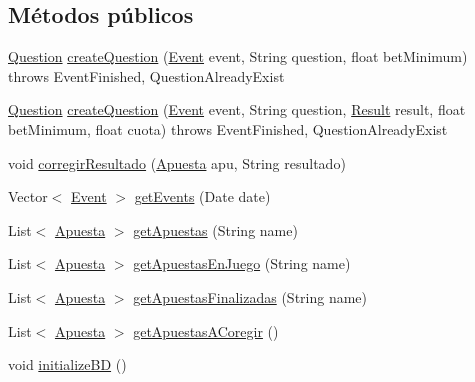 \subsection*{Métodos públicos}
\begin{DoxyCompactItemize}
\item 
\mbox{\hyperlink{classdomain_1_1Question}{Question}} \mbox{\hyperlink{interfacebusinessLogic_1_1BLFacade_a64a013f322555816e67b601d38f53a1a}{create\+Question}} (\mbox{\hyperlink{classdomain_1_1Event}{Event}} event, String question, float bet\+Minimum)  throws Event\+Finished, Question\+Already\+Exist
\item 
\mbox{\hyperlink{classdomain_1_1Question}{Question}} \mbox{\hyperlink{interfacebusinessLogic_1_1BLFacade_a7ca4a9726d4132b8e54b6a45a321bec8}{create\+Question}} (\mbox{\hyperlink{classdomain_1_1Event}{Event}} event, String question, \mbox{\hyperlink{classdomain_1_1Result}{Result}} result, float bet\+Minimum, float cuota)  throws Event\+Finished, Question\+Already\+Exist
\item 
void \mbox{\hyperlink{interfacebusinessLogic_1_1BLFacade_ac643520df65287794056938207db059f}{corregir\+Resultado}} (\mbox{\hyperlink{classdomain_1_1Apuesta}{Apuesta}} apu, String resultado)
\item 
Vector$<$ \mbox{\hyperlink{classdomain_1_1Event}{Event}} $>$ \mbox{\hyperlink{interfacebusinessLogic_1_1BLFacade_a9db26f96faa50c91cb53fb831695c98f}{get\+Events}} (Date date)
\item 
List$<$ \mbox{\hyperlink{classdomain_1_1Apuesta}{Apuesta}} $>$ \mbox{\hyperlink{interfacebusinessLogic_1_1BLFacade_ae1f0952366adb9a51b00889e7be9cf11}{get\+Apuestas}} (String name)
\item 
List$<$ \mbox{\hyperlink{classdomain_1_1Apuesta}{Apuesta}} $>$ \mbox{\hyperlink{interfacebusinessLogic_1_1BLFacade_ac88f2aca4613139544b5061d157b91a4}{get\+Apuestas\+En\+Juego}} (String name)
\item 
List$<$ \mbox{\hyperlink{classdomain_1_1Apuesta}{Apuesta}} $>$ \mbox{\hyperlink{interfacebusinessLogic_1_1BLFacade_aeface90d3879409333ceb8ab9cf134e0}{get\+Apuestas\+Finalizadas}} (String name)
\item 
List$<$ \mbox{\hyperlink{classdomain_1_1Apuesta}{Apuesta}} $>$ \mbox{\hyperlink{interfacebusinessLogic_1_1BLFacade_a7cd14457ed6f9b5aaef992f780a51c20}{get\+Apuestas\+A\+Coregir}} ()
\item 
void \mbox{\hyperlink{interfacebusinessLogic_1_1BLFacade_a8c041928b06257ae83a56fa86e8c282b}{initialize\+BD}} ()
\item 

\end{DoxyCompactItemize}
